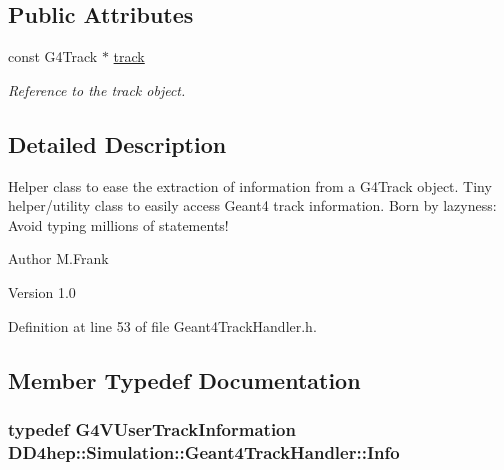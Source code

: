 \subsection*{Public Attributes}
\begin{DoxyCompactItemize}
\item 
const G4Track $\ast$ \hyperlink{class_d_d4hep_1_1_simulation_1_1_geant4_track_handler_a40a5ac7eb61ca69314a64f9f3c5a0f0b}{track}
\begin{DoxyCompactList}\small\item\em Reference to the track object. \item\end{DoxyCompactList}\end{DoxyCompactItemize}


\subsection{Detailed Description}
Helper class to ease the extraction of information from a G4Track object. Tiny helper/utility class to easily access Geant4 track information. Born by lazyness: Avoid typing millions of statements!

\begin{DoxyAuthor}{Author}
M.Frank 
\end{DoxyAuthor}
\begin{DoxyVersion}{Version}
1.0 
\end{DoxyVersion}


Definition at line 53 of file Geant4TrackHandler.h.

\subsection{Member Typedef Documentation}
\hypertarget{class_d_d4hep_1_1_simulation_1_1_geant4_track_handler_a0db29f37f6c64822f75c656ac27c03b4}{
\subsubsection[{Info}]{\setlength{\rightskip}{0pt plus 5cm}typedef {\bf G4VUserTrackInformation} {\bf DD4hep::Simulation::Geant4TrackHandler::Info}}}
\label{class_d_d4hep_1_1_simulation_1_1_geant4_track_handler_a0db29f37f6c64822f75c656ac27c03b4}


